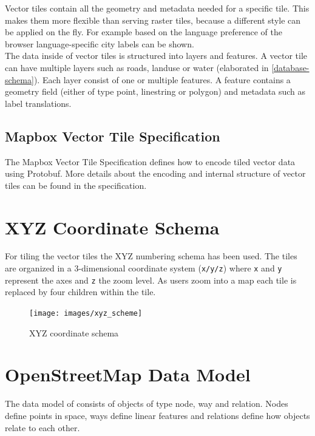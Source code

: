 Vector tiles contain all the geometry and metadata needed for a specific tile. This makes them more flexible than serving raster tiles, because a different style can be applied on the fly. For example based on the language preference of the browser language-specific city labels can be shown.\\

The data inside of vector tiles is structured into layers and features. A vector tile can have multiple layers such as roads, landuse or water (elaborated in \autoref{database-schema}). Each layer consist of one or multiple features. A feature contains a geometry field (either of type point, linestring or polygon) and metadata such as label translations.

\subsection*{Mapbox Vector Tile Specification}\label{part1_vector_tile_specification}

The Mapbox Vector Tile Specification defines how to encode tiled vector data using Protobuf. More details about the encoding and internal structure of vector tiles can be found in the specification\cite{104_mapbox.com_2016}.

\section{XYZ Coordinate Schema}\label{part1_xyz_coordinates}

For tiling the vector tiles the XYZ numbering schema has been used.
The tiles are organized in a 3-dimensional coordinate system (\texttt{x/y/z}) where \texttt{x} and \texttt{y} represent the axes and \texttt{z} the zoom level. As users zoom into a map each tile is replaced by four children within the tile.

\begin{figure}[H]
\centering
\texttt{[image: images/xyz\_scheme]}
\caption{XYZ coordinate schema}
\end{figure}

\section{OpenStreetMap Data Model}\label{openstreetmap_data_model}

The data model of \osm{} consists of objects of type node, way and relation. Nodes define points in space, ways define linear features and relations define how objects relate to each other\cite{1_osm_wiki_2016}.

